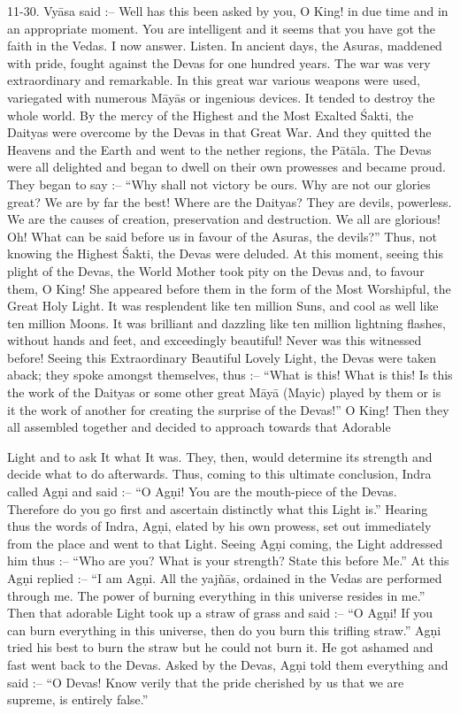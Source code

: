 11-30. Vy\=asa said :-- Well has this been asked by you, O King! in due time and in an appropriate moment. You are intelligent and it seems that you have got the faith in the Vedas. I now answer. Listen. In ancient days, the Asuras, maddened with pride, fought against the Devas for one hundred years. The war was very extraordinary and remarkable. In this great war various weapons were used, variegated with numerous M\=ay\=as or ingenious devices. It tended to destroy the whole world. By the mercy of the Highest and the Most Exalted \'Sakti, the Daityas were overcome by the Devas in that Great War. And they quitted the Heavens and the Earth and went to the nether regions, the P\=at\=ala. The Devas were all delighted and began to dwell on their own prowesses and became proud. They began to say :-- ``Why shall not victory be ours. Why are not our glories great? We are by far the best! Where are the Daityas? They are devils, powerless. We are the causes of creation, preservation and destruction. We all are glorious! Oh! What can be said before us in favour of the Asuras, the devils?'' Thus, not knowing the Highest \'Sakti, the Devas were deluded. At this moment, seeing this plight of the Devas, the World Mother took pity on the Devas and, to favour them, O King! She appeared before them in the form of the Most Worshipful, the Great Holy Light. It was resplendent like ten million Suns, and cool as well like ten million Moons. It was brilliant and dazzling like ten million lightning flashes, without hands and feet, and exceedingly beautiful! Never was this witnessed before! Seeing this Extraordinary Beautiful Lovely Light, the Devas were taken aback; they spoke amongst themselves, thus :-- ``What is this! What is this! Is this the work of the Daityas or some other great M\=ay\=a (Mayic) played by them or is it the work of another for creating the surprise of the Devas!'' O King! Then they all assembled together and decided to approach towards that Adorable

Light and to ask It what It was. They, then, would determine its strength and decide what to do afterwards. Thus, coming to this ultimate conclusion, Indra called Ag\d{n}i and said :-- ``O Ag\d{n}i! You are the mouth-piece of the Devas. Therefore do you go first and ascertain distinctly what this Light is.'' Hearing thus the words of Indra, Ag\d{n}i, elated by his own prowess, set out immediately from the place and went to that Light. Seeing Ag\d{n}i coming, the Light addressed him thus :-- ``Who are you? What is your strength? State this before Me.'' At this Ag\d{n}i replied :-- ``I am Ag\d{n}i. All the yaj\~n\=as, ordained in the Vedas are performed through me. The power of burning everything in this universe resides in me.'' Then that adorable Light took up a straw of grass and said :-- ``O Ag\d{n}i! If you can burn everything in this universe, then do you burn this trifling straw.'' Ag\d{n}i tried his best to burn the straw but he could not burn it. He got ashamed and fast went back to the Devas. Asked by the Devas, Ag\d{n}i told them everything and said :-- ``O Devas! Know verily that the pride cherished by us that we are supreme, is entirely false.''

